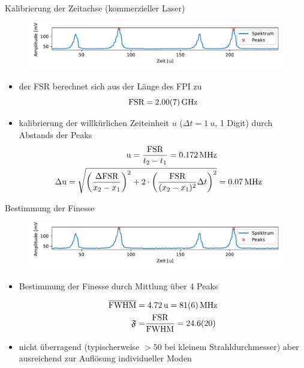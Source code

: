 \documentclass[10pt, aspectratio=169]{beamer}
\begin{document}
\begin{frame}{Kalibrierung der Zeitachse (kommerzieller Laser)}
  \begin{figure}
    \includegraphics[width=1\columnwidth]{figs/fsrkalib.pdf}
  \end{figure}
  \begin{itemize}
  \item<1-> der FSR berechnet sich aus der L\"ange des FPI zu
    \begin{equation}
      \label{eq:realfsr}
      \text{FSR} = \SI{2.00+-0.07}{\giga\hertz}
    \end{equation}
  \item<2-> kalibrierung der willk\"urlichen Zeiteinheit \(u\)
    (\(\Delta t = \SI{1}{u}\), 1 Digit) durch Abstands der Peaks
    \begin{eqnarray}
      \label{eq:unithertz}
      \si{u} = \frac{\text{FSR}}{t_2-t_1} =\SI{.172}{\mega\hertz} \\
      \Delta\si{u}  = \sqrt{\qty(\frac{\Delta\text{FSR}}{x_2-x_1})^2 +
      2\cdot\qty(\frac{\text{FSR}}{(x_2-x_1)^2}\Delta t)^2}  & = \SI{.07}{\mega\hertz}
    \end{eqnarray}
  \end{itemize}
\end{frame}

\begin{frame}{Bestimmung der Finesse}
  \begin{figure}
    \includegraphics[width=1\columnwidth]{figs/fsrkalib.pdf}
  \end{figure}
  \begin{itemize}
  \item<2-> Bestimmung der Finesse durch Mittlung \"uber 4 Peaks

    \begin{align}
      \label{eq:fwhmlaser}
      \overline{\text{FWHM}} =&\; \SI{4.72}{u} = \SI{81\pm
                                6}{\mega\hertz} \\
      \mathfrak{F} =& \frac{\text{FSR}}{\text{FWHM}}=\SI{24.6\pm 2.0}{}
    \end{align}
  \item<3-> nicht \"uberragend (typischerweise \(> 50\) bei kleinem
    Strahldurchmesser\cite{HENDOW1997343}) aber ausreichend zur
    Aufl\"osung individueller Moden
  \end{itemize}
\end{frame}
\end{document}
